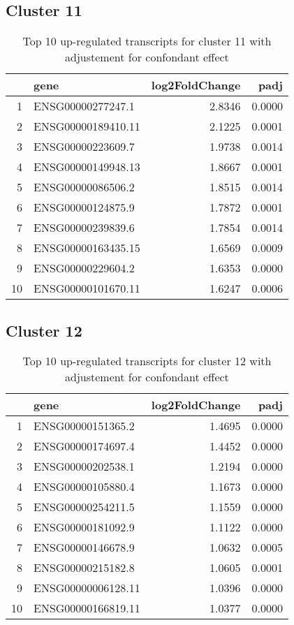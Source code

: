 \documentclass{article}
\begin{document}
\subsection{Cluster 11 }
\begin{table}[H]
\centering
\begin{tabular}{rlrr}
  \hline
 & gene & log2FoldChange & padj \\ 
  \hline
1 & ENSG00000277247.1 & 2.8346 & 0.0000 \\ 
  2 & ENSG00000189410.11 & 2.1225 & 0.0001 \\ 
  3 & ENSG00000223609.7 & 1.9738 & 0.0014 \\ 
  4 & ENSG00000149948.13 & 1.8667 & 0.0001 \\ 
  5 & ENSG00000086506.2 & 1.8515 & 0.0014 \\ 
  6 & ENSG00000124875.9 & 1.7872 & 0.0001 \\ 
  7 & ENSG00000239839.6 & 1.7854 & 0.0014 \\ 
  8 & ENSG00000163435.15 & 1.6569 & 0.0009 \\ 
  9 & ENSG00000229604.2 & 1.6353 & 0.0000 \\ 
  10 & ENSG00000101670.11 & 1.6247 & 0.0006 \\ 
   \hline
\end{tabular}
\caption{Top 10 up-regulated transcripts for cluster 11 with adjustement for confondant effect} 
\label{tab:q3_1_conf_11}
\end{table}
\subsection{Cluster 12 }
\begin{table}[H]
\centering
\begin{tabular}{rlrr}
  \hline
 & gene & log2FoldChange & padj \\ 
  \hline
1 & ENSG00000151365.2 & 1.4695 & 0.0000 \\ 
  2 & ENSG00000174697.4 & 1.4452 & 0.0000 \\ 
  3 & ENSG00000202538.1 & 1.2194 & 0.0000 \\ 
  4 & ENSG00000105880.4 & 1.1673 & 0.0000 \\ 
  5 & ENSG00000254211.5 & 1.1559 & 0.0000 \\ 
  6 & ENSG00000181092.9 & 1.1122 & 0.0000 \\ 
  7 & ENSG00000146678.9 & 1.0632 & 0.0005 \\ 
  8 & ENSG00000215182.8 & 1.0605 & 0.0001 \\ 
  9 & ENSG00000006128.11 & 1.0396 & 0.0000 \\ 
  10 & ENSG00000166819.11 & 1.0377 & 0.0000 \\ 
   \hline
\end{tabular}
\caption{Top 10 up-regulated transcripts for cluster 12 with adjustement for confondant effect} 
\label{tab:q3_1_conf_12}
\end{table}
\end{document}
